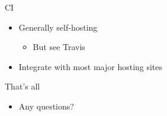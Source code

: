\documentclass[presentation]{beamer}
\begin{document}
\begin{frame}[label=sec-4-4]{CI}
\begin{itemize}
\item Generally self-hosting
\begin{itemize}
\item But see Travis
\end{itemize}
\item Integrate with most major hosting sites
\end{itemize}
\end{frame}
\begin{frame}[label=sec-4-5]{That's all}
\begin{itemize}
\item Any questions?
\end{itemize}
\end{frame}
\end{document}
